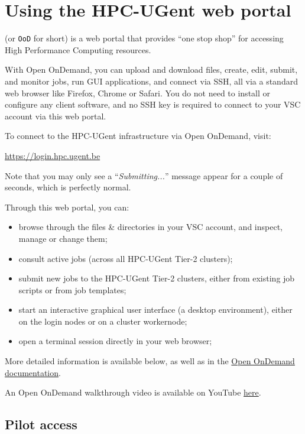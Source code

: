 \chapter{Using the HPC-UGent web portal}
\label{ch:web_portal}

\href{https://openondemand.org/}{} (or \texttt{OoD} for short)
is a web portal that provides ``one stop shop'' for accessing High Performance Computing resources.

With Open OnDemand, you can upload and download files, create, edit, submit, and monitor jobs,
run GUI applications, and connect via SSH, all via a standard web browser like Firefox, Chrome
or Safari. You do not need to install or configure any client software,
and no SSH key is required to connect to your VSC account via this web portal.

To connect to the HPC-UGent infrastructure via Open OnDemand, visit:

\begin{center}\url{https://login.hpc.ugent.be}\end{center}

Note that you may only see a ``\emph{Submitting...}'' message appear for a couple of seconds,
which is perfectly normal.

Through this web portal, you can:
\begin{itemize}
    \item browse through the files \& directories in your VSC account, and inspect, manage or change them;
    \item consult active jobs (across all HPC-UGent Tier-2 clusters);
    \item submit new jobs to the HPC-UGent Tier-2 clusters, either from existing job scripts or from job templates;
    \item start an interactive graphical user interface (a desktop environment), either on the login nodes or on a cluster workernode;
    \item open a terminal session directly in your web browser;
\end{itemize}

More detailed information is available below, as well as in the \href{https://osc.github.io/ood-documentation/master/}{Open OnDemand documentation}.

An Open OnDemand walkthrough video is available on YouTube \href{https://www.youtube.com/watch?v=4-w-4wjlnPk}{here}.

\section*{Pilot access}

